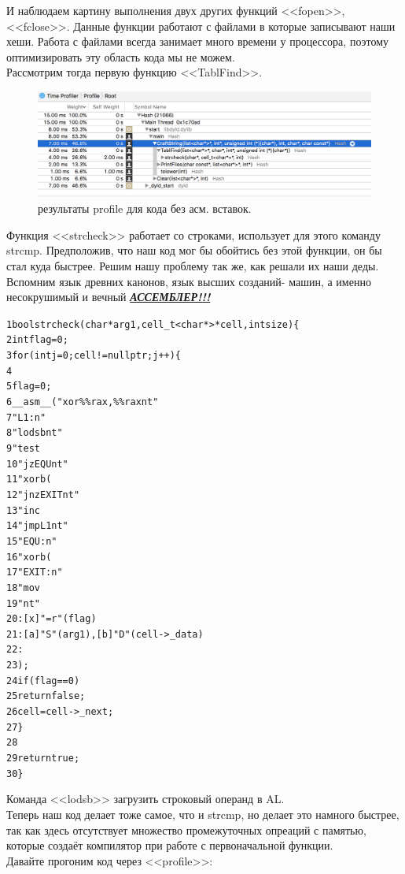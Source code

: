 \documentclass[a4paper,12pt]{article} %
\begin{document}
И наблюдаем картину выполнения двух других функций <<fopen>>, <<fclose>>. Данные функции работают с файлами в которые записывают наши хеши. Работа с файлами всегда занимает много времени у процессора, поэтому оптимизировать эту область кода мы не можем.\\

Рассмотрим тогда первую функцию <<TablFind>>.\\
\newpage

\begin{figure}[h!]
\begin{center}
\includegraphics[width=1\textwidth]{3}
\end{center}
\caption{результаты profile для кода без асм. вставок.}
\end{figure}


Функция <<strcheck>> работает со строками, использует для этого команду strcmp. Предположив, что наш код мог бы обойтись без этой функции, он бы стал куда быстрее. Решим нашу проблему так же, как решали их наши деды. Вспомним язык древних канонов, язык высших созданий- машин, а именно несокрушимый и вечный \textbf{\underline{\textit{АССЕМБЛЕР!!!}}}

\begin{alltt}
1	bool strcheck(char* arg1, cell_t<char*>* cell, int size) \{
2	    int flag = 0;
3	    for (int j = 0; cell != nullptr; j++) \{
4	        
5	        flag = 0;
6	        \_\_asm\_\_ ("xor \%\%rax, \%\%rax              nt"
7	                 "L1:                           n"
8	                 "lodsb                         nt"
9	                 "test %
10	                 "jz EQU                        nt"
11	                 "xorb (%
12	                 "jnz EXIT                      nt"
13	                 "inc %
14	                 "jmp L1                        nt"
15	                 "EQU:                          n"
16	                 "xorb (%
17	                 "EXIT:                         n"
18	                 "mov %
19	                 "nt"
20                  : [x] "=r" (flag)
21	                : [a] "S" (arg1), [b] "D" (cell->_data)
22                 :
23                 );
24        if (flag == 0)
25            return false;
26        cell = cell->_next;
27    \}
28    
29    return true;
30\}
\end{alltt}
Команда <<lodsb>> загрузить строковый операнд в AL.\\
Теперь наш код делает тоже самое, что и strcmp, но делает это намного быстрее, так как здесь отсутствует множество промежуточных опреаций с памятью, которые создаёт компилятор при работе с первоначальной функции.\\
Давайте прогоним код через <<profile>>:
\end{document}
